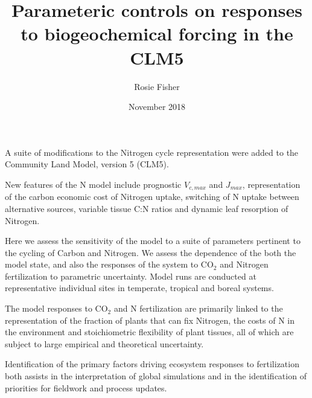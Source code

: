 \documentclass[draft,linenumbers]{agujournal}
\begin{document}

\title{Parameteric controls on responses to biogeochemical forcing in the CLM5}
\author{Rosie Fisher}
\date{November 2018}









\begin{keypoints}

\item A suite of modifications to the Nitrogen cycle representation were added to the Community Land Model, version 5 (CLM5).

\item New features of the N model include prognostic $V_{c,max}$ and $J_{max}$, representation of the carbon economic cost of Nitrogen uptake, switching of N uptake between alternative sources, variable tissue C:N ratios and dynamic leaf resorption of Nitrogen.

\item Here we assess the sensitivity of the model to a suite of parameters pertinent to the cycling of Carbon and Nitrogen. We assess the dependence of the both the model state, and also the responses of the system to CO$_{2}$ and Nitrogen fertilization to parametric uncertainty. Model runs are conducted at representative individual sites in temperate, tropical and boreal systems.

\item The model responses to CO$_{2}$  and N fertilization are primarily linked to the representation of the fraction of plants that can fix Nitrogen, the costs of N in the environment and stoichiometric flexibility of plant tissues, all of which are subject to large empirical and theoretical uncertainty.

\item Identification of the primary factors driving ecosystem responses to fertilization both assists in the interpretation of global simulations and in the identification of priorities for fieldwork and process updates.
\end{keypoints}
\end{document}

